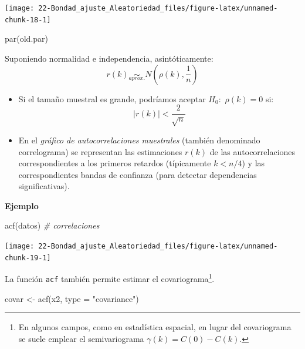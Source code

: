 \documentclass[
]{book}
\newenvironment{Shaded}{\begin{snugshade}}{\end{snugshade}}
\newcommand{\AttributeTok}[1]{\textcolor[rgb]{0.77,0.63,0.00}{#1}}
\newcommand{\CommentTok}[1]{\textcolor[rgb]{0.56,0.35,0.01}{\textit{#1}}}
\newcommand{\FunctionTok}[1]{\textcolor[rgb]{0.00,0.00,0.00}{#1}}
\newcommand{\NormalTok}[1]{#1}
\newcommand{\OtherTok}[1]{\textcolor[rgb]{0.56,0.35,0.01}{#1}}
\newcommand{\StringTok}[1]{\textcolor[rgb]{0.31,0.60,0.02}{#1}}
\theoremstyle{break}
\theoremstyle{definition}
\theoremstyle{definition}
\theoremstyle{definition}
\theoremstyle{definition}
\theoremstyle{remark}
\begin{document}
\begin{center}\texttt{[image: 22-Bondad\_ajuste\_Aleatoriedad\_files/figure-latex/unnamed-chunk-18-1]} \end{center}

\begin{Shaded}
\begin{Highlighting}[]
\FunctionTok{par}\NormalTok{(old.par)}
\end{Highlighting}
\end{Shaded}

Suponiendo normalidad e independencia, asintóticamente:
\[r(k)\underset{aprox.}{\sim}N\left(  \rho(k),\frac{1}{n}\right)\]

\begin{itemize}
\item
  Si el tamaño muestral es grande, podríamos aceptar \(H_{0}:\)
  \(\rho\left( k\right) = 0\) si:\[|r(k)|<\dfrac{2}{\sqrt{n}}\]
\item
  En el \emph{gráfico de autocorrelaciones muestrales} (también
  denominado correlograma) se representan las estimaciones \(r(k)\)
  de las autocorrelaciones correspondientes a los primeros retardos
  (típicamente \(k<n/4\)) y las correspondientes bandas de confianza
  (para detectar dependencias significativas).
\end{itemize}

\textbf{Ejemplo}

\begin{Shaded}
\begin{Highlighting}[]
\FunctionTok{acf}\NormalTok{(datos)  }\CommentTok{\# correlaciones}
\end{Highlighting}
\end{Shaded}

\begin{center}\texttt{[image: 22-Bondad\_ajuste\_Aleatoriedad\_files/figure-latex/unnamed-chunk-19-1]} \end{center}

La función \texttt{acf} también permite estimar el covariograma\footnote{En algunos campos, como en estadística espacial, en lugar del covariograma se suele emplear el semivariograma \(\gamma(k) = C(0) - C(k)\).}.

\begin{Shaded}
\begin{Highlighting}[]
\NormalTok{covar }\OtherTok{\textless{}{-}} \FunctionTok{acf}\NormalTok{(x2, }\AttributeTok{type =} \StringTok{"covariance"}\NormalTok{)}
\end{Highlighting}
\end{Shaded}
\end{document}
